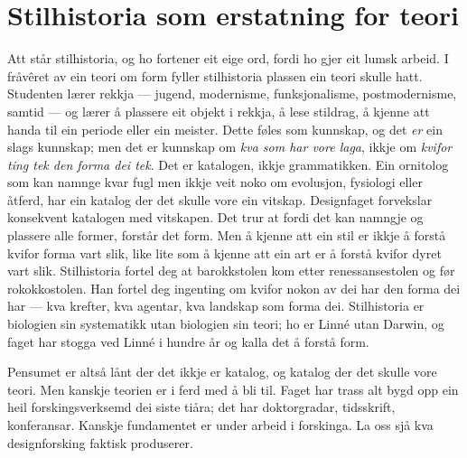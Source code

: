 \section{Stilhistoria som erstatning for teori}

Att står stilhistoria, og ho fortener eit eige ord, fordi ho gjer eit lumsk arbeid. I fråvêret av ein teori om form fyller stilhistoria plassen ein teori skulle hatt. Studenten lærer rekkja — jugend, modernisme, funksjonalisme, postmodernisme, samtid — og lærer å plassere eit objekt i rekkja, å lese stildrag, å kjenne att handa til ein periode eller ein meister. Dette føles som kunnskap, og det \emph{er} ein slags kunnskap; men det er kunnskap om \emph{kva som har vore laga}, ikkje om \emph{kvifor ting tek den forma dei tek}. Det er katalogen, ikkje grammatikken. Ein ornitolog som kan namnge kvar fugl men ikkje veit noko om evolusjon, fysiologi eller åtferd, har ein katalog der det skulle vore ein vitskap. Designfaget forvekslar konsekvent katalogen med vitskapen. Det trur at fordi det kan namngje og plassere alle former, forstår det form. Men å kjenne att ein stil er ikkje å forstå kvifor forma vart slik, like lite som å kjenne att ein art er å forstå kvifor dyret vart slik. Stilhistoria fortel deg at barokkstolen kom etter renessansestolen og før rokokkostolen. Han fortel deg ingenting om kvifor nokon av dei har den forma dei har — kva krefter, kva agentar, kva landskap som forma dei. Stilhistoria er biologien sin systematikk utan biologien sin teori; ho er Linné utan Darwin, og faget har stogga ved Linné i hundre år og kalla det å forstå form.

\vignett

Pensumet er altså lånt der det ikkje er katalog, og katalog der det skulle vore teori. Men kanskje teorien er i ferd med å bli til. Faget har trass alt bygd opp ein heil forskingsverksemd dei siste tiåra; det har doktorgradar, tidsskrift, konferansar. Kanskje fundamentet er under arbeid i forskinga. La oss sjå kva designforsking faktisk produserer.
